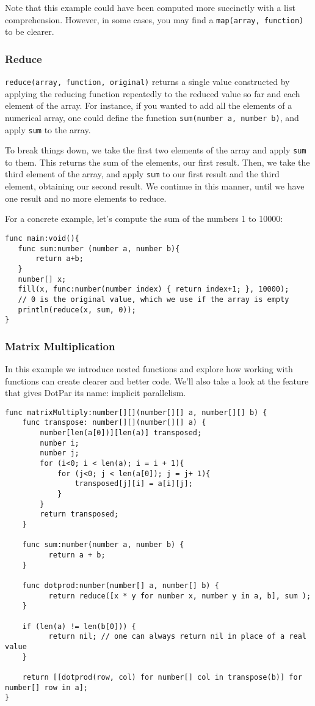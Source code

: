 \documentclass{article}
\begin{document}
Note that this example could have been computed more succinctly with a list comprehension. However, in some cases, you may find a \verb!map(array, function)! to be clearer.

\subsubsection{Reduce}
\verb!reduce(array, function, original)! returns a single value constructed by applying the reducing function repeatedly to the reduced value so far and each element of the array. For instance, if you wanted to add all the elements of a numerical array, one could define the function \verb!sum(number a, number b)!, and apply \verb!sum! to the array.

To break things down, we take the first two elements of the array and apply \verb!sum! to them. This returns the sum of the elements, our first result. Then, we take the third element of the array, and apply \verb!sum! to our first result and the third element, obtaining our second result. We continue in this manner, until we have one result and no more elements to reduce.

For a concrete example, let's compute the sum of the numbers 1 to 10000:

\begin{verbatim}
func main:void(){
   func sum:number (number a, number b){
       return a+b;
   }
   number[] x;
   fill(x, func:number(number index) { return index+1; }, 10000);
   // 0 is the original value, which we use if the array is empty
   println(reduce(x, sum, 0));
}
\end{verbatim}

\subsubsection{Matrix Multiplication}
In this example we introduce nested functions and explore how working with functions can create clearer and better code. We'll also take a look at the feature that gives DotPar its name: implicit parallelism.

\begin{verbatim}
func matrixMultiply:number[][](number[][] a, number[][] b) {
    func transpose: number[][](number[][] a) {
        number[len(a[0])][len(a)] transposed;
        number i;
        number j;
        for (i<0; i < len(a); i = i + 1){
            for (j<0; j < len(a[0]); j = j+ 1){
                transposed[j][i] = a[i][j];
            }
        }
        return transposed;
    }

    func sum:number(number a, number b) {
          return a + b;
    }
    
    func dotprod:number(number[] a, number[] b) {
          return reduce([x * y for number x, number y in a, b], sum );
    }
    
    if (len(a) != len(b[0])) {
          return nil; // one can always return nil in place of a real value
    }
    
    return [[dotprod(row, col) for number[] col in transpose(b)] for number[] row in a];
}
\end{verbatim}
\end{document}
